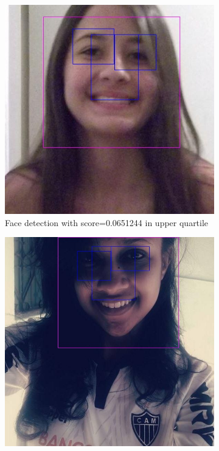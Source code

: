 \begin{figure}
    \centering
    \begin{subfigure}[t]{0.3\textwidth}
      \includegraphics[width=\textwidth]{figures/spec/detected_q3_15c3f02d-31c6-4955-8d05-c05029cdb473}
      \caption{Face detection with score=0.0651244 in upper quartile}
      \label{fig:spec:fd:q3_detected2}
    \end{subfigure}
    \begin{subfigure}[t]{0.3\textwidth}
      \includegraphics[width=\textwidth]{figures/spec/detected_median_fcb1d3ed-7867-40ba-9691-8cd1f59dc36b}

\end{subfigure}
\end{figure}
